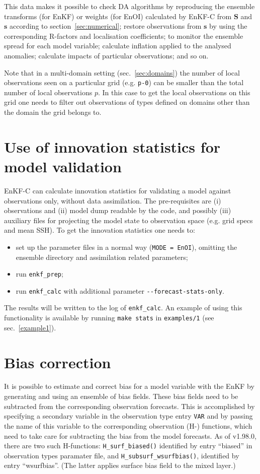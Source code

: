 \documentclass[11pt]{report}
\newcommand{\mb} {\mathbf}
\begin{document}
This data makes it possible to check DA algorithms by reproducing the ensemble transforms (for EnKF) or weights (for EnOI) calculated by EnKF-C from $\mb S$ and $\mb s$ according to section~\ref{sec:numerical}; restore observations from $\mb s$ by using the corresponding R-factors and localisation coefficients; to monitor the ensemble spread for each model variable; calculate inflation applied to the analysed anomalies; calculate impacts of particular observations; and so on.

Note that in a multi-domain setting (sec.~\ref{sec:domains}) the number of local observations seen on a particular grid (e.g. \verb|p-0|) can be smaller than the total number of local observations $p$.
In this case to get the local observations on this grid one needs to filter out observations of types defined on domains other than the domain the grid belongs to.

\section{Use of innovation statistics for model validation}

EnKF-C can calculate innovation statistics for validating a model against observations only, without data assimilation.
The pre-requisites are (i) observations and (ii) model dump readable by the code, and possibly (iii) auxiliary files for projecting the model state to observation space (e.g. grid specs and mean SSH).
To get the innovation statistics one needs to:
\begin{itemize}
\item set up the parameter files in a normal way (\verb|MODE = EnOI|), omitting the ensemble directory and assimilation related parameters;
\item run \verb|enkf_prep|;
\item run \verb|enkf_calc| with additional parameter \verb|--forecast-stats-only|.
\end{itemize}
The results will be written to the log of \verb|enkf_calc|. 
An example of using this functionality is available by running \verb|make stats| in \verb|examples/1| (see sec.~\ref{example1}).

\section{Bias correction}
\label{sec:bias}

It is possible to estimate and correct bias for a model variable with the EnKF by generating and using an ensemble of bias fields.
These bias fields need to be subtracted from the corresponding observation forecasts.
This is accomplished by specifying a secondary variable in the observation type entry \verb|VAR| and by passing the name of this variable to the corresponding observation (H-) functions, which need to take care for subtracting the bias from the model forecasts.
As of v1.98.0, there are two such H-functions: \verb|H_surf_biased()| identified by entry ``biased'' in observation types paramater file, and \verb|H_subsurf_wsurfbias()|, identified by entry ``wsurfbias''.
(The latter applies surface bias field to the mixed layer.)
\end{document}
